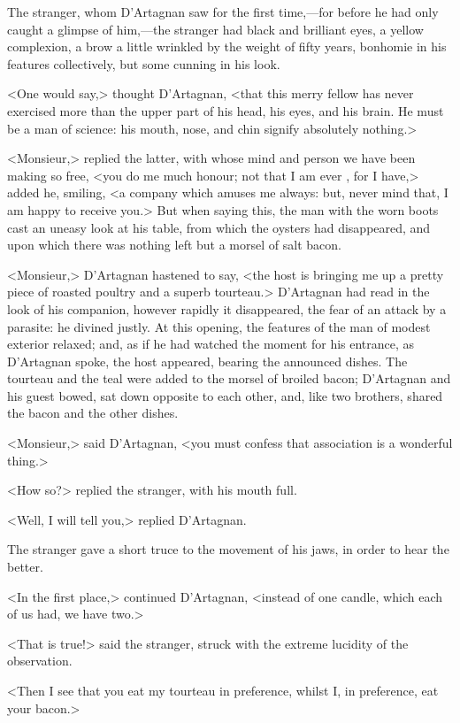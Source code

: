 The stranger, whom D'Artagnan saw for the first time,—for before he had only caught a glimpse of him,—the stranger had black and brilliant eyes, a yellow complexion, a brow a little wrinkled by the weight of fifty years, bonhomie in his features collectively, but some cunning in his look.

<One would say,> thought D'Artagnan, <that this merry fellow has never exercised more than the upper part of his head, his eyes, and his brain. He must be a man of science: his mouth, nose, and chin signify absolutely nothing.>

<Monsieur,> replied the latter, with whose mind and person we have been making so free, <you do me much honour; not that I am ever , for I have,> added he, smiling, <a company which amuses me always: but, never mind that, I am happy to receive you.> But when saying this, the man with the worn boots cast an uneasy look at his table, from which the oysters had disappeared, and upon which there was nothing left but a morsel of salt bacon.

<Monsieur,> D'Artagnan hastened to say, <the host is bringing me up a pretty piece of roasted poultry and a superb tourteau.> D'Artagnan had read in the look of his companion, however rapidly it disappeared, the fear of an attack by a parasite: he divined justly. At this opening, the features of the man of modest exterior relaxed; and, as if he had watched the moment for his entrance, as D'Artagnan spoke, the host appeared, bearing the announced dishes. The tourteau and the teal were added to the morsel of broiled bacon; D'Artagnan and his guest bowed, sat down opposite to each other, and, like two brothers, shared the bacon and the other dishes.

<Monsieur,> said D'Artagnan, <you must confess that association is a wonderful thing.>

<How so?> replied the stranger, with his mouth full.

<Well, I will tell you,> replied D'Artagnan.

The stranger gave a short truce to the movement of his jaws, in order to hear the better.

<In the first place,> continued D'Artagnan, <instead of one candle, which each of us had, we have two.>

<That is true!> said the stranger, struck with the extreme lucidity of the observation.

<Then I see that you eat my tourteau in preference, whilst I, in preference, eat your bacon.>

